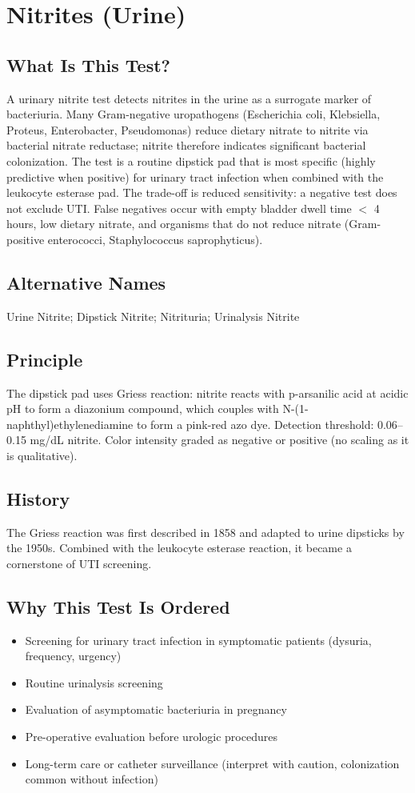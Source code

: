 \chapter{Nitrites (Urine)}

\section*{What Is This Test?}
A urinary nitrite test detects nitrites in the urine as a surrogate marker of bacteriuria. Many Gram-negative uropathogens (Escherichia coli, Klebsiella, Proteus, Enterobacter, Pseudomonas) reduce dietary nitrate to nitrite via bacterial nitrate reductase; nitrite therefore indicates significant bacterial colonization. The test is a routine dipstick pad that is most specific (highly predictive when positive) for urinary tract infection when combined with the leukocyte esterase pad. The trade-off is reduced sensitivity: a negative test does not exclude UTI. False negatives occur with empty bladder dwell time $<$ 4 hours, low dietary nitrate, and organisms that do not reduce nitrate (Gram-positive enterococci, Staphylococcus saprophyticus).

\section*{Alternative Names}
Urine Nitrite; Dipstick Nitrite; Nitrituria; Urinalysis Nitrite

\section*{Principle}
The dipstick pad uses Griess reaction: nitrite reacts with p-arsanilic acid at acidic pH to form a diazonium compound, which couples with N-(1-naphthyl)ethylenediamine to form a pink-red azo dye. Detection threshold: 0.06--0.15 mg/dL nitrite. Color intensity graded as negative or positive (no scaling as it is qualitative).

\section*{History}
The Griess reaction was first described in 1858 and adapted to urine dipsticks by the 1950s. Combined with the leukocyte esterase reaction, it became a cornerstone of UTI screening.

\section*{Why This Test Is Ordered}
\begin{itemize}
  \item Screening for urinary tract infection in symptomatic patients (dysuria, frequency, urgency)
  \item Routine urinalysis screening
  \item Evaluation of asymptomatic bacteriuria in pregnancy
  \item Pre-operative evaluation before urologic procedures
  \item Long-term care or catheter surveillance (interpret with caution, colonization common without infection)
\end{itemize}

